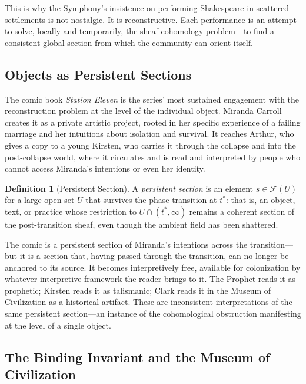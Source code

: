 \documentclass[12pt, oneside]{article}
\theoremstyle{plain}
\theoremstyle{definition}
\newtheorem{definition}[theorem]{Definition}
\theoremstyle{remark}
\newcommand{\Sheaf}{\mathcal{F}}
\begin{document}
This is why the Symphony's insistence on performing Shakespeare in
scattered settlements is not nostalgic. It is reconstructive. Each
performance is an attempt to solve, locally and temporarily, the
sheaf cohomology problem---to find a consistent global section from
which the community can orient itself.

\subsection{Objects as Persistent Sections}

The comic book \textit{Station Eleven} is the series' most sustained
engagement with the reconstruction problem at the level of the
individual object. Miranda Carroll creates it as a private artistic
project, rooted in her specific experience of a failing marriage and
her intuitions about isolation and survival. It reaches Arthur, who
gives a copy to a young Kirsten, who carries it through the collapse
and into the post-collapse world, where it circulates and is read
and interpreted by people who cannot access Miranda's intentions or
even her identity.

\begin{definition}[Persistent Section]
\label{def:persistent-section}
A \emph{persistent section} is an element $s \in \Sheaf(U)$ for a
large open set $U$ that survives the phase transition at $t^*$: that
is, an object, text, or practice whose restriction to $U \cap
(t^*, \infty)$ remains a coherent section of the post-transition
sheaf, even though the ambient field has been shattered.
\end{definition}

The comic is a persistent section of Miranda's intentions across the
transition---but it is a section that, having passed through the
transition, can no longer be anchored to its source. It becomes
interpretively free, available for colonization by whatever
interpretive framework the reader brings to it. The Prophet reads
it as prophetic; Kirsten reads it as talismanic; Clark reads it in
the Museum of Civilization as a historical artifact. These are
inconsistent interpretations of the same persistent section---an
instance of the cohomological obstruction manifesting at the level
of a single object.

\subsection{The Binding Invariant and the Museum of Civilization}
\end{document}
